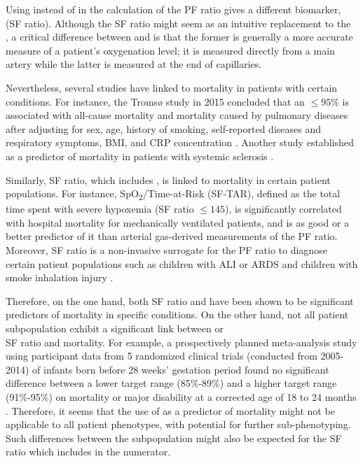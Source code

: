 Using \Sp instead of \Pa in the calculation of the PF ratio gives a different biomarker, \SF (SF ratio). Although the SF ratio might seem as an intuitive replacement to the \\  \PF, a critical difference between \Pa and \Sp is that the former is generally a more accurate measure of a patient's oxygenation level; it is measured directly from a main artery while the latter is measured at the end of capillaries. 

Nevertheless, several studies have linked \Sp to mortality in patients with certain conditions. For instance, the Tromsø study in 2015 concluded that an \Sp $\leq95\%$ is associated with all-cause mortality and mortality caused by pulmonary diseases after adjusting for sex, age, history of smoking, self-reported diseases and respiratory symptoms, BMI, and CRP concentration \citep{vold2015low}. Another study established \Sp as a predictor of mortality in patients with systemic sclerosis  \citep{swigris2009exercise}. 

Similarly, SF ratio, which includes \Sp, is linked to mortality in certain patient populations. For instance, SpO\textsubscript{2}/\Fi Time-at-Risk (SF-TAR), defined as the total time spent with severe hypoxemia (SF ratio $\leq 145$), is  significantly correlated with hospital mortality for mechanically ventilated patients, and is as good or a better predictor of it than arterial gas-derived measurements of the PF ratio. Moreover, SF ratio is a non-invasive surrogate for the PF ratio to diagnose certain patient populations such as children with ALI or ARDS \citep{rice2007comparison} and children with smoke inhalation injury \citep{cambiaso2017correlation}. 

Therefore, on the one hand, both SF ratio and \Sp have been shown to be significant predictors of mortality in specific conditions. On the other hand, not all patient subpopulation exhibit a significant link between \Sp or \\ SF ratio and mortality. For example, a prospectively planned meta-analysis study using participant data from 5 randomized clinical trials (conducted from 2005-2014) of infants born before 28 weeks' gestation period found no significant difference between a lower \Sp target range (85\%-89\%) and a higher \Sp target range (91\%-95\%) on mortality or major disability at a corrected age of 18 to 24 months \citep{askie2018association}. Therefore, it seems that the use of \Sp as a predictor of mortality might not be applicable to all patient phenotypes, with potential for further sub-phenotyping. Such differences between the subpopulation might also be expected for the SF ratio which includes \Sp in the numerator. 


